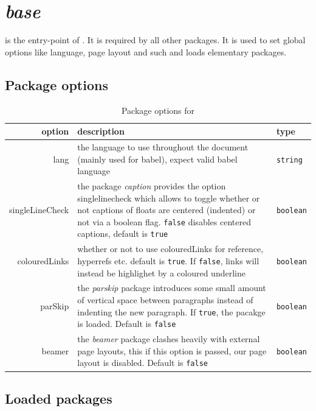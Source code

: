 \section{\textsl{base}}\label{sec:base}

\pbase{} is the entry-point of \prettytex{}. It is required by all other packages. It is used to set global options like language, page layout and such and loads elementary packages. 


\subsection{Package options}

\begin{table}[H]
    \centering
    \begin{tabular}{r|p{12cm}|l}
        \hline\textbf{option} & \textbf{description} & \textbf{type}\\\hline
        lang & the language to use throughout the document (mainly used for babel), expect valid babel language & \verb|string|\\
        singleLineCheck & the package \textsl{caption} provides the option singlelinecheck which allows to toggle whether or not captions of floats are centered (indented) or not via a boolean flag. \verb|false| disables centered captions, default is \verb|true| & \verb|boolean|\\
        colouredLinks & whether or not to use colouredLinks for reference, hyperrefs etc. default is \verb|true|. If \verb|false|, links will instead be highlighet by a coloured underline & \verb|boolean|\\
        parSkip & the \textsl{parskip} package introduces some small amount of vertical space between paragraphs instead of indenting the new paragraph. If \verb|true|, the pacakge is loaded. Default is \verb|false| & \verb|boolean|\\
        beamer & the \textsl{beamer} package clashes heavily with external page layouts, this if this option is passed, our page layout is disabled. Default is \verb|false| & \verb|boolean|
    \end{tabular}
    \caption{Package options for \pbase{}}
    \label{tab:base_options}
\end{table}


\subsection{Loaded packages}

